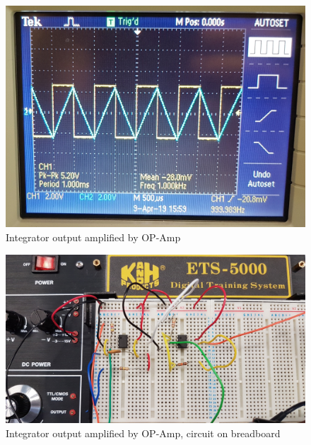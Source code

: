 \documentclass[a4paper,11pt]{article}
\begin{document}
\begin{flushleft}
\begin{enumerate}
			\begin{figure}[ht]
				\centering
				\includegraphics[width=0.6\linewidth]{Amplification_osc}
				\caption{Integrator output amplified by OP-Amp}
			\end{figure}
		\newpage
			\begin{figure}[ht]
				\centering
				\includegraphics[width=\linewidth]{Apmlification}
				\caption{Integrator output amplified by OP-Amp, circuit on breadboard}
			\end{figure}
			
			
		\end{enumerate}			
			
	\end{flushleft}
\end{document}
